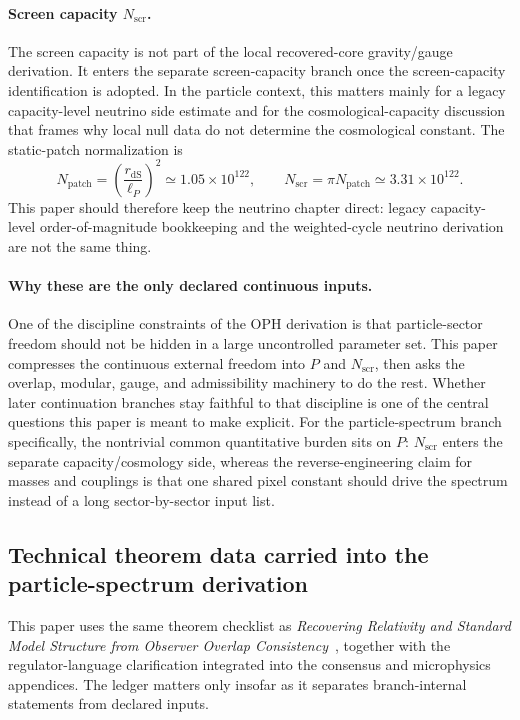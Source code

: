 \documentclass[11pt]{article}
\begin{document}
\paragraph{Screen capacity \(N_{\mathrm{scr}}\).}
The screen capacity is not part of the local recovered-core gravity/gauge derivation. It enters
the separate screen-capacity branch once the screen-capacity identification is adopted. In the
particle context, this matters mainly for a legacy capacity-level neutrino side estimate and for the
cosmological-capacity discussion that frames why local null data do not determine the
cosmological constant. The static-patch normalization is
\[
N_{\mathrm{patch}}=\left(\frac{r_{\mathrm{dS}}}{\ell_P}\right)^2\simeq1.05\times10^{122},
\qquad
N_{\mathrm{scr}}=\pi N_{\mathrm{patch}}\simeq3.31\times10^{122}.
\]
This paper should therefore keep the neutrino chapter direct:
legacy capacity-level order-of-magnitude bookkeeping and the weighted-cycle neutrino derivation are not the
same thing.

\paragraph{Why these are the only declared continuous inputs.}
One of the discipline constraints of the OPH derivation is that particle-sector freedom should not
be hidden in a large uncontrolled parameter set. This paper compresses the
continuous external freedom into \(P\) and \(N_{\mathrm{scr}}\), then asks the overlap,
modular, gauge, and admissibility machinery to do the rest. Whether later continuation branches
stay faithful to that discipline is one of the central questions this paper is meant to
make explicit. For the particle-spectrum branch specifically, the nontrivial common quantitative
burden sits on \(P\): \(N_{\mathrm{scr}}\) enters the separate capacity/cosmology side, whereas
the reverse-engineering claim for masses and couplings is that one shared pixel constant should
drive the spectrum instead of a long sector-by-sector input list.

\subsection{Technical theorem data carried into the particle-spectrum derivation}

This paper uses the same theorem checklist as
\emph{Recovering Relativity and Standard Model Structure from Observer Overlap Consistency}~\cite{ophcompact}, together with
the regulator-language clarification integrated into the consensus and microphysics
appendices. The ledger matters only
insofar as it separates branch-internal statements from declared inputs.
\end{document}

